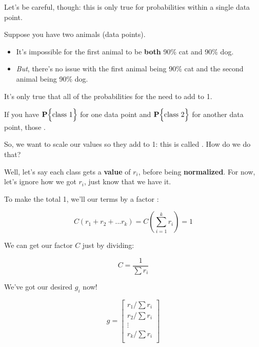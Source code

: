         Let's be careful, though: this is only true for probabilities within a single data point.
        
        \miniex Suppose you have two animals (data points).
        
            \begin{itemize}
                \item It's impossible for the first animal to be \textbf{both} 90\% cat and 90\% dog.
                \item \textit{But}, there's no issue with the first animal being 90\% cat and the second animal being 90\% dog.\\
            \end{itemize}

        \begin{clarification}
            It's only true that all of the probabilities for the  need to add to 1.

            If you have $\mathbf{P} \Bigl\{\text{class 1}\Bigr\}$ for one data point and $\mathbf{P} \Bigl\{\text{class 2}\Bigr\}$ for another data point, those .
        \end{clarification}
        
        So, we want to scale our values so they add to 1: this is called . How do we do that?
        
        Well, let's say each class gets a \textbf{value} of $r_i$, before being \textbf{normalized}. For now, let's ignore how we got $r_i$, just know that we have it.
        
        To make the total 1, we'll  our terms by a factor :
        
        \begin{equation}
            C(r_1+r_2+...r_k) 
            = 
            C \left(\sum_{i=1}^k r_i \right)
            =
            1  
        \end{equation}
        
        We can get our factor $C$ just by dividing:
        
        \begin{equation}
            C 
            =
            \frac{1}{\sum r_i}
        \end{equation}
        
        We've got our desired $g_i$ now!
        
        \begin{equation}
            g = 
            \begin{bmatrix}
                r_1/\sum r_i  \\
                r_2/\sum r_i  \\
                \vdots  \\
                r_k/\sum r_i  \\
            \end{bmatrix}
        \end{equation}
        
